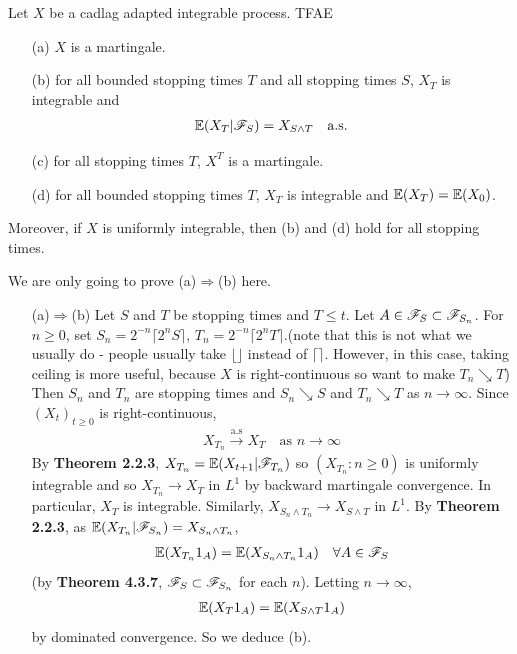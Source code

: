 \documentclass[12pt,a4paper]{report}
\newenvironment{proof}
{\begin{changemargin}{1cm}{0.5cm} 
	}%
	{\end{changemargin}
}
\begin{document}
 Let $X$ be a cadlag adapted integrable process. TFAE
\begin{itemize}
\item[(a)] $X$ is a martingale.
\item[(b)] for all bounded stopping times $T$ and all stopping times $S$, $X_T$ is integrable and
\begin{align*}
\mathbb{E}(X_T |\mathscr{F}_S) = X_{S\wedge T} \quad \text{a.s.} 
\end{align*}
\item[(c)] for all stopping times $T$, $X^T$ is a martingale.
\item[(d)] for all bounded stopping times $T$, $X_T$ is integrable and $\mathbb{E} (X_T) = \mathbb{E}(X_0)$.
\end{itemize}
Moreover, if $X$ is uniformly integrable, then (b) and (d) hold for all stopping times.
\begin{proof}
\pf We are only going to prove (a)$\Rightarrow$(b) here.
\begin{itemize}
\item[(a)$\Rightarrow$(b)] Let $S$ and $T$ be stopping times and $T\leq t$. Let $A\in \mathscr{F}_S \subset \mathscr{F}_{S_n}$. For $n \geq 0$, set $S_n = 2^{-n} \lceil 2^n S \rceil$, $T_n = 2^{-n} \lceil 2^n T \rceil$.(note that this is not what we usually do - people usually take $\lfloor \rfloor$ instead of $\lceil \rceil$. However, in this case, taking ceiling is more useful, because $X$ is right-continuous so want to make $T_n \searrow T$) Then $S_n$ and $T_n$ are stopping times and $S_n \searrow S$ and $T_n \searrow T$ as $n\rightarrow \infty$. Since $(X_t)_{t\geq 0}$ is right-continuous, 
\begin{align*}
X_{T_n} \xrightarrow{\text{a.s}} X_T \quad \text{as } n\rightarrow \infty
\end{align*}
By \textbf{Theorem 2.2.3}, $X_{T_n} = \mathbb{E}(X_{t+1}|\mathscr{F}_{T_n})$ so $(X_{T_n} : n\geq 0)$ is uniformly integrable and so $X_{T_n} \rightarrow X_T$ in $L^1$ by backward martingale convergence. In particular, $X_T$ is integrable. Similarly,  $X_{S_n \wedge T_n} \rightarrow X_{S\wedge T}$ in $L^1$. By \textbf{Theorem 2.2.3}, as $\mathbb{E}(X_{T_n} |\mathscr{F}_{S_n}) = X_{S_n \wedge T_n}$,
\begin{align*}
\mathbb{E}(X_{T_n}1_A) = \mathbb{E}(X_{S_n \wedge T_n} 1_A) \quad \forall A\in \mathscr{F}_S
\end{align*} 
(by \textbf{Theorem 4.3.7}, $\mathscr{F}_S \subset \mathscr{F}_{S_n}$ for each $n$). Letting $n\rightarrow \infty$,
\begin{align*}
\mathbb{E}(X_T 1_A) = \mathbb{E}(X_{S\wedge T}1_A)
\end{align*}
by dominated convergence. So we deduce (b).
\end{itemize}

\eop
\end{proof}
\end{document}

